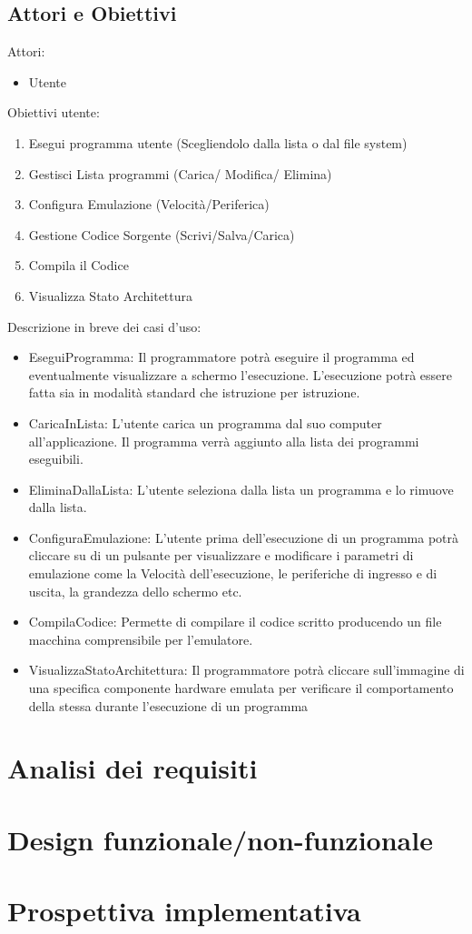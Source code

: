 \documentclass[11pt]{article}
\begin{document}
\subsection{Attori e Obiettivi}
Attori:
\begin{itemize}
	\item{Utente}
\end{itemize}
Obiettivi utente:
\begin{enumerate}
	\item{
		Esegui programma utente (Scegliendolo dalla lista o dal file system)
	}
	\item{
		Gestisci Lista programmi (Carica/ Modifica/ Elimina)
	}
	\item{
		Configura Emulazione (Velocità/Periferica)
	}
	\item{
		Gestione Codice Sorgente (Scrivi/Salva/Carica)
	}
	\item{
		Compila il Codice 
	}
	\item{
		Visualizza Stato Architettura 
	}
\end{enumerate}

Descrizione in breve dei casi d’uso:
\begin{itemize}
\item{
	EseguiProgramma: Il programmatore potrà eseguire il programma ed eventualmente visualizzare a schermo l’esecuzione. L’esecuzione potrà essere fatta sia in modalità standard che istruzione per istruzione.
}
\item{
	CaricaInLista: L’utente carica un programma dal suo computer all’applicazione. Il programma verrà aggiunto alla lista dei programmi eseguibili.
}
\item{
	EliminaDallaLista: L’utente seleziona dalla lista un programma e lo rimuove dalla lista.
}
\item{
	ConfiguraEmulazione: L’utente prima dell’esecuzione di un programma potrà cliccare su di un pulsante per visualizzare e modificare i parametri di emulazione come la Velocità dell’esecuzione, le periferiche di ingresso e di uscita, la grandezza dello schermo etc. 
}
\item{
	CompilaCodice: Permette di compilare il codice scritto producendo un file macchina comprensibile per l’emulatore.
}
\item{
	VisualizzaStatoArchitettura: Il programmatore potrà cliccare sull’immagine di una specifica componente hardware emulata per verificare il comportamento della stessa durante l’esecuzione di un programma
}
\end{itemize}






\section{Analisi dei requisiti}

\section{Design funzionale/non-funzionale}

\section{Prospettiva implementativa}
\end{document}
